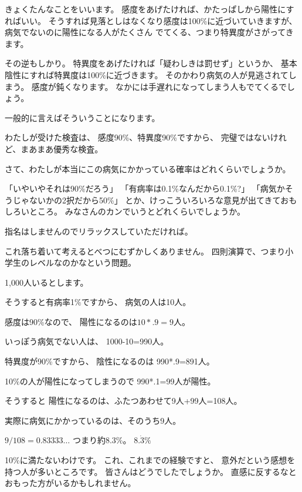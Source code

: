 \documentclass[uplatex,jis2004,dvipdfmx,12pt]{jsarticle}
\begin{document}
きょくたんなことをいいます。
感度をあげたければ、かたっぱしから陽性にすればいい。
そうすれば見落としはなくなり感度は100\%に近づいていきますが、
病気でないのに陽性になる人がたくさん
でてくる、つまり特異度がさがってきます。

その逆もしかり。
特異度をあげたければ「疑わしきは罰せず」というか、
基本陰性にすれば特異度は100\%に近づきます。
そのかわり病気の人が見逃されてしまう。
感度が鈍くなります。
なかには手遅れになってしまう人もでてくるでしょう。

一般的に言えばそういうことになります。

わたしが受けた検査は、
感度90\%、特異度90\%ですから、
完璧ではないけれど、まあまあ優秀な検査。


さて、わたしが本当にこの病気にかかっている確率はどれくらいでしょうか。

「いやいやそれは90\%だろう」
「有病率は0.1\%なんだから0.1\%?」
「病気かそうじゃないかの2択だから50\%」
とか、けっこういろいろな意見が出てきておもしろいところ。
みなさんのカンでいうとどれくらいでしょうか。

指名はしませんのでリラックスしていただければ。

これ落ち着いて考えるとべつにむずかしくありません。
四則演算で、つまり小学生のレベルなのかなという問題。


1,000人いるとします。

そうすると有病率1\%ですから、
病気の人は10人。


感度は90\%なので、
陽性になるのは$10*.9=9$人。


いっぽう病気でない人は、
1000-10=990人。

特異度が90\%ですから、
陰性になるのは
990*.9=891人。

10\%の人が陽性になってしまうので
990*.1=99人が陽性。

そうすると
陽性になるのは、ふたつあわせて9人+99人=108人。

実際に病気にかかっているのは、そのうち9人。

$9/108=0.83333\dots$
つまり約8.3\%。
$8.\dot{3}\%$

10\%に満たないわけです。
これ、これまでの経験ですと、
意外だという感想を持つ人が多いところです。
皆さんはどうでしたでしょうか。
直感に反するなとおもった方がいるかもしれません。



\bigskip
\end{document}
